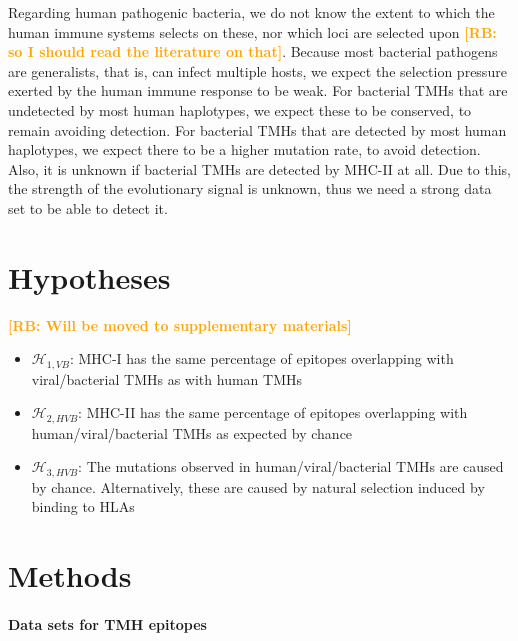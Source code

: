 \documentclass{article}
\newcommand{\richel}[1]{\textcolor{orange}{\textbf{[RB: #1]}}}
\begin{document}
Regarding human pathogenic bacteria, we do not know the extent to which the 
human immune systems selects on these, nor which loci are selected
upon \richel{so I should read the literature on that}.
Because most bacterial pathogens are generalists, that is,
can infect multiple hosts, we expect the selection pressure exerted
by the human immune response to be weak.
For bacterial TMHs that are undetected by most human haplotypes, we
expect these to be conserved, to remain avoiding detection.
For bacterial TMHs that are detected by most human haplotypes, we
expect there to be a higher mutation rate, to avoid detection.
Also, it is unknown if bacterial TMHs are detected by MHC-II at all.
Due to this, the strength of the evolutionary signal is unknown,
thus we need a strong data set to be able to detect it.

\section{Hypotheses}

\richel{Will be moved to supplementary materials}

\begin{itemize}
  \item $\mathcal{H}_{1,VB}$: MHC-I has the same percentage of epitopes overlapping
    with viral/bacterial TMHs as with human TMHs
  \item $\mathcal{H}_{2,HVB}$: MHC-II has the same percentage of epitopes overlapping
    with human/viral/bacterial TMHs as expected by chance
  \item $\mathcal{H}_{3,HVB}$: The mutations observed in 
    human/viral/bacterial TMHs are caused by chance.
    Alternatively, these are caused by natural selection
    induced by binding to HLAs
\end{itemize}

\section{Methods}

\paragraph{Data sets for TMH epitopes}
\end{document}
